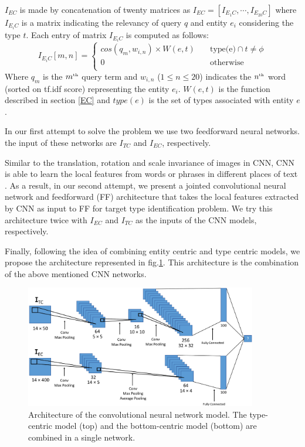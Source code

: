 $I_{EC}$ is made by concatenation of twenty matrices as $I_{EC} = [I_{E_1C},\cdots, I_{E_{20}C}]$ where $I_{E_iC}$ is a matrix indicating the relevancy of query $q$ and entity $e_i$ considering the type $t$. Each entry of matrix $I_{E_iC}$ is computed as follows:
\begin{equation}
I_{E_iC}[m,n] = 
\begin{cases}
cos(q_m,w_{i,n}) \times W(e,t) &\quad\text{type(e)} \cap t \neq \phi \\
0 &\quad\text{otherwise} \\
\end{cases}
\end{equation}
Where $q_m$ is the $m^{\text{\tiny th}}$ query term and $w_{i,n}$ ($1\leq n \leq20$) indicates the $n^{\text{\tiny th}}$ word (sorted on tf.idf score) representing the entity $e_i$. $W(e,t)$ is the function  described in section \ref{EC} and $type(e)$ is the set of types associated with entity $e$.


In our first attempt to solve the problem we use two feedforward neural networks. the input of these networks are $I_{TC}$ and $I_{EC}$, respectively.


Similar to the translation, rotation and scale invariance of images in CNN, CNN is able to learn the local features from words or phrases in different places of text \cite{wang2016combination}. As a result, in our second attempt, we present a jointed convolutional neural network and feedforward (FF) architecture that takes the local features extracted by CNN as input to FF for target type identification problem. We try this architecture twice with $I_{EC}$ and $I_{TC}$ as the inputs of the CNN models, respectively.

Finally, following the idea of combining entity centric and type centric models\cite{Balog:2011:QME:2037661.2037667,Garigliotti:2017:TTI:3077136.3080659}, we propose the architecture represented in fig.\ref{proposeModel}. This architecture is the combination of the above mentioned CNN networks.


\begin{figure}
	\includegraphics[width=0.9\textwidth]{model_vis1.pdf} \caption{Architecture of the convolutional neural network model. The type-centric model (top) and the bottom-centric model (bottom) are combined in a single network.}
	\label{proposeModel}
\end{figure}
